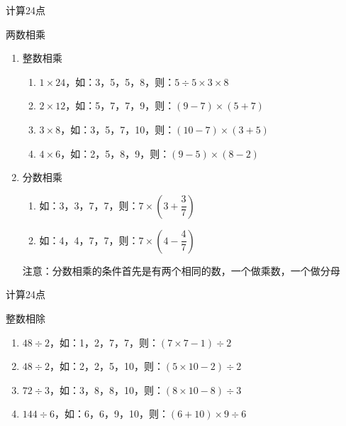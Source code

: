 \documentclass[aspectratio=169]{ctexbeamer} %
\begin{document}
\begin{frame}[t]{计算24点}
\begin{spacing}{1.4}
\normalsize
\alert{两数相乘}
\begin{enumerate}[label={\arabic*.}]
\item 整数相乘
	\begin{enumerate}[label={\Alph*.}]
	\item $1 \times 24$，如：3，5，5，8，则：$5 \div 5 \times 3 \times 8$
	\item $2 \times 12$，如：5，7，7，9，则：$(9-7) \times (5+7)$
	\item $3 \times 8$，如：3，5，7，10，则：$(10-7) \times (3+5)$
	\item $4 \times 6$，如：2，5，8，9，则：$(9-5) \times (8-2)$
	\end{enumerate}
\item 分数相乘
	\begin{enumerate}[label={\Alph*.}]
	\item 如：3，3，7，7，则：$7 \times ( 3 + \dfrac{3}{7})$
	\item 如：4，4，7，7，则：$7 \times (4 - \dfrac{4}{7})$
	\end{enumerate}
	\alert{注意：分数相乘的条件首先是有两个相同的数，一个做乘数，一个做分母}
\end{enumerate}
\end{spacing}
\end{frame}

\begin{frame}[t]{计算24点}
\begin{spacing}{2.5}
\normalsize
\alert{整数相除}
\begin{enumerate}[label={\arabic*.}]
\item $48 \div 2$，如：1，2，7，7，则：$(7 \times 7 - 1) \div 2$
\item $48 \div 2$，如：2，2，5，10，则：$(5 \times 10 - 2) \div 2$
\item $72 \div 3$，如：3，8，8，10，则：$(8 \times 10 - 8) \div 3$
\item  $144 \div 6$，如：6，6，9，10，则：$(6 + 10) \times 9 \div 6$
\end{enumerate}
\end{spacing}
\end{frame}
\end{document}
